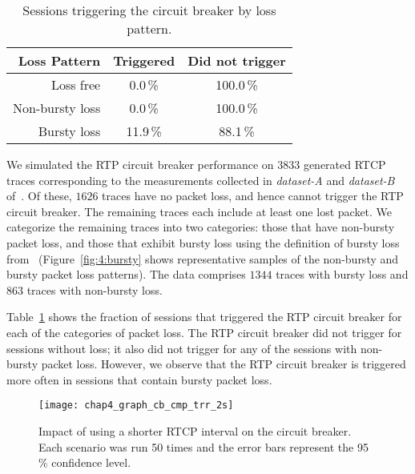 \begin{table}
  \begin{center}
    \begin{tabular}{rcc}
    \toprule
      \textbf{Loss Pattern}   & \textbf{Triggered} & \textbf{Did not trigger} \\
    \midrule
             Loss free &   0.0\,\% & 100.0\,\% \\
       Non-bursty loss &   0.0\,\% & 100.0\,\% \\
          Bursty loss  &  11.9\,\% &  88.1\,\% \\
    \bottomrule
    \end{tabular}
    \caption{Sessions triggering the circuit breaker by loss pattern.}
    \label{tab:4:cb_bursty}
  \end{center}
\end{table}

We simulated the RTP circuit breaker performance on $3833$ generated RTCP traces
corresponding to the measurements collected in \emph{dataset-A} and
\emph{dataset-B} of~\cite{ellis:2011:dataset}. Of these, $1626$ traces have no
packet loss, and hence cannot trigger the RTP circuit breaker. The remaining
traces each include at least one lost packet. We categorize the remaining
traces into two categories: those that have non-bursty packet loss, and those
that exhibit bursty loss using the definition of bursty loss
from~\cite{rfc3611} (Figure~\ref{fig:4:bursty} shows representative samples of
the non-bursty and bursty packet loss patterns). The data comprises $1344$
traces with bursty loss and $863$ traces with non-bursty loss.



Table~\ref{tab:4:cb_bursty} shows the fraction of sessions that triggered the
RTP circuit breaker for each of the categories of packet loss. The RTP circuit
breaker did not trigger for sessions without loss; it also did not trigger for
any of the sessions with non-bursty packet loss. However, we observe that the
RTP circuit breaker is triggered more often in sessions that contain bursty
packet loss. 

\begin{figure}[!t]
  \centerline{
    {\texttt{[image: chap4\_graph\_cb\_cmp\_trr\_2s]}}
  }
  \caption{Impact of using a shorter RTCP interval on the
  circuit breaker. Each scenario was run 50 times and the error bars represent
  the 95\,\% confidence level.}
  \label{fig:4:short-rtcp}
\end{figure}

